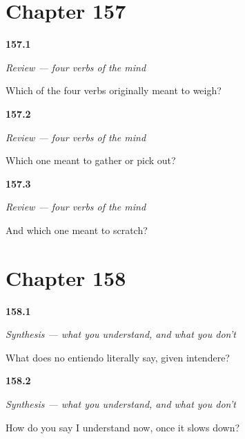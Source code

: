 \section*{Chapter 157}

\noindent\begin{minipage}[t]{\linewidth}
\raggedright
\hypertarget{review-ES-C34-repaso-mente-weigh}{\textbf{157.1}} \emph{Review — four verbs of the mind}\par
\small Which of the four verbs originally meant to weigh?
\end{minipage}\par\medskip

\noindent\begin{minipage}[t]{\linewidth}
\raggedright
\hypertarget{review-ES-C34-repaso-mente-gather}{\textbf{157.2}} \emph{Review — four verbs of the mind}\par
\small Which one meant to gather or pick out?
\end{minipage}\par\medskip

\noindent\begin{minipage}[t]{\linewidth}
\raggedright
\hypertarget{review-ES-C34-repaso-mente-scratch}{\textbf{157.3}} \emph{Review — four verbs of the mind}\par
\small And which one meant to scratch?
\end{minipage}\par\medskip

\section*{Chapter 158}

\noindent\begin{minipage}[t]{\linewidth}
\raggedright
\hypertarget{review-ES-C34-sintesis-mente-literal}{\textbf{158.1}} \emph{Synthesis — what you understand, and what you don't}\par
\small What does no entiendo literally say, given intendere?
\end{minipage}\par\medskip

\noindent\begin{minipage}[t]{\linewidth}
\raggedright
\hypertarget{review-ES-C34-sintesis-mente-now}{\textbf{158.2}} \emph{Synthesis — what you understand, and what you don't}\par
\small How do you say I understand now, once it slows down?
\end{minipage}\par\medskip

